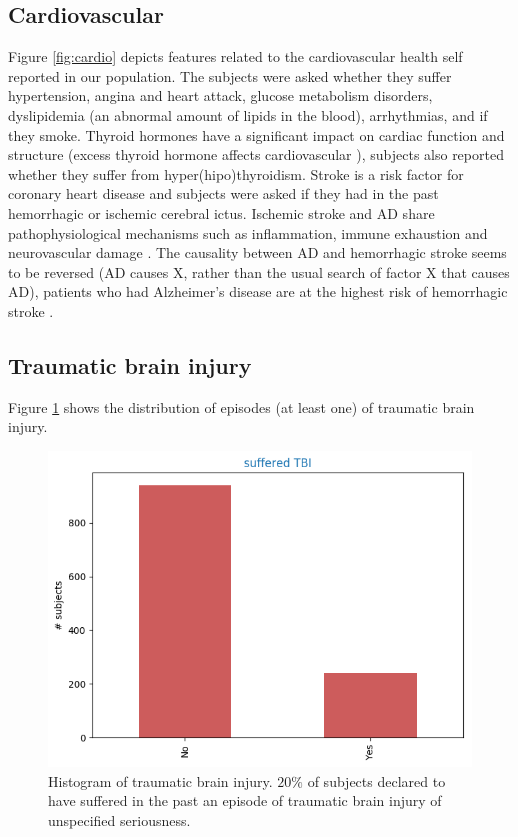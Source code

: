 \documentclass[11pt]{article}
\theoremstyle{definition}
\theoremstyle{remark}
\begin{document}
\subsection{Cardiovascular}
\label{ssse:cardio}

Figure \ref{fig:cardio} depicts features related to the cardiovascular health self reported in our population. The subjects were asked whether they suffer hypertension, angina and heart attack, glucose metabolism disorders, dyslipidemia (an abnormal amount of lipids in the blood), arrhythmias, and if they smoke. 
Thyroid hormones have a significant impact on cardiac function and structure (excess thyroid hormone affects cardiovascular \cite{klein2007thyroid}), subjects also reported whether they suffer from hyper(hipo)thyroidism.
Stroke is a risk factor for coronary heart disease and subjects were asked if they had in the past hemorrhagic or ischemic cerebral ictus. Ischemic stroke and AD share pathophysiological mechanisms such as inflammation, immune exhaustion and neurovascular damage \cite{lucke2015common}. 
The causality between AD and hemorrhagic stroke seems to be reversed (AD causes X, rather than the usual search of factor X that causes AD), patients who had Alzheimer's disease are at the highest risk of hemorrhagic stroke \cite{wang2014newly}.

\subsection{Traumatic brain injury}
\label{ssse:tbe}
Figure \ref{fig:tce} shows the distribution of episodes (at least one) of traumatic brain injury. 
\begin{figure}[H]
        \centering
        \includegraphics[keepaspectratio, width=0.6\linewidth]{figures/Fig_tce}
        \caption{Histogram of traumatic brain injury. $20\%$ of subjects declared to have suffered in the past an episode of traumatic brain injury of unspecified seriousness.} 
        \label{fig:tce}
\end{figure}
\end{document}
